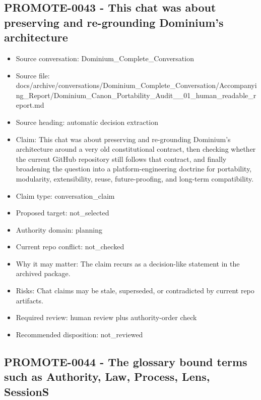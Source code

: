 \documentclass[11pt,a4paper]{report}
\begin{document}
\subsection{PROMOTE-0043 - This chat was about preserving and re-grounding Dominium's architecture}

\begin{itemize}
\item Source conversation: Dominium\_Complete\_Conversation
\item Source file: docs/archive/conversations/Dominium\_Complete\_Conversation/Accompanying\_Report/Dominium\_Canon\_Portability\_Audit\_\_01\_human\_readable\_report.md
\item Source heading: automatic decision extraction
\item Claim: This chat was about preserving and re-grounding Dominium's architecture around a very old constitutional contract, then checking whether the current GitHub repository still follows that contract, and finally broadening the question into a platform-engineering doctrine for portability, modularity, extensibility, reuse, future-proofing, and long-term compatibility.
\item Claim type: conversation\_claim
\item Proposed target: not\_selected
\item Authority domain: planning
\item Current repo conflict: not\_checked
\item Why it may matter: The claim recurs as a decision-like statement in the archived package.
\item Risks: Chat claims may be stale, superseded, or contradicted by current repo artifacts.
\item Required review: human review plus authority-order check
\item Recommended disposition: not\_reviewed
\end{itemize}

\subsection{PROMOTE-0044 - The glossary bound terms such as Authority, Law, Process, Lens, SessionS}
\end{document}
